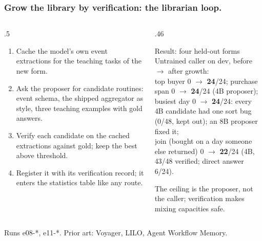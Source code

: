 \documentclass[aspectratio=169,11pt]{beamer}
\newcommand{\source}[1]{\vfill{\scriptsize\color{Gray}#1\par}}
\begin{document}
\begin{frame}[t]
\frametitle{Grow the library by verification: the librarian loop.}
\begin{columns}[T,onlytextwidth]
\begin{column}{.5\textwidth}
\small
\begin{enumerate}\setlength{\itemsep}{1pt}
\item Cache the model's own event extractions for the teaching tasks of the new form.
\item Ask the proposer for candidate routines: event schema, the shipped aggregator as style,
three teaching examples with gold answers.
\item Verify each candidate on the cached extractions against gold; keep the best above threshold.
\item Register it with its verification record; it enters the statistics table like any route.
\end{enumerate}
\end{column}
\begin{column}{.46\textwidth}
\begin{block}{Result: four held-out forms}
Untrained caller on dev, before $\to$ after growth:\\
top buyer 0 $\to$ \textbf{24}/24; purchase span 0 $\to$ \textbf{24}/24 (4B proposer);\\
busiest day 0 $\to$ \textbf{24}/24: every 4B candidate had one sort bug (\alert{0/48}, kept out); an 8B proposer fixed it;\\
join (bought on a day someone else returned) 0 $\to$ \textbf{22}/24 (4B, 43/48 verified; direct answer 6/24).
\end{block}
\small The ceiling is the proposer, not the caller; verification makes mixing capacities safe.
\end{column}
\end{columns}
\source{Runs e08-*, e11-*. Prior art: Voyager, LILO, Agent Workflow Memory.}
\end{frame}
\end{document}

